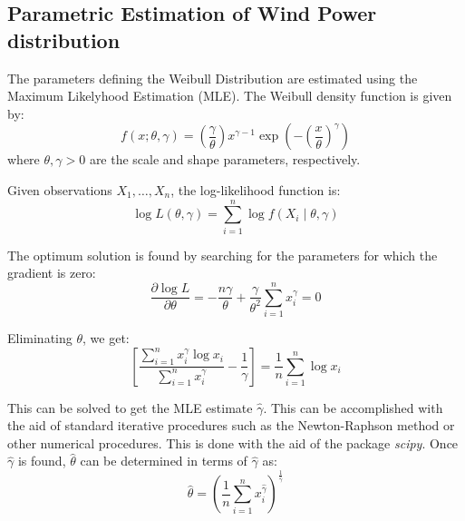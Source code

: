 {%

\subsection{Parametric Estimation of Wind Power distribution}\label{subsection: weib estim}

The parameters defining the Weibull Distribution are estimated using the Maximum Likelyhood Estimation (MLE). 
The Weibull density function is given by:
\begin{equation}
f(x; \theta, \gamma) = \left(\frac{\gamma}{\theta}\right)x^{\gamma-1}\exp\left(-\left(\frac{x}{\theta}\right)^\gamma\right)
\end{equation}
where \(\theta, \gamma > 0\) are the scale and shape parameters, respectively. 

Given observations \(X_1, \ldots, X_n\), the log-likelihood function is:
\begin{equation}
\log L(\theta, \gamma) = \sum_{i=1}^n \log f(X_i \mid \theta, \gamma)
\end{equation}

The optimum solution is found by searching for the parameters for which the gradient is zero:
\begin{equation}
\frac{\partial \log L}{\partial \theta} = -\frac{n \gamma}{\theta} + \frac{\gamma}{\theta^2} \sum_{i=1}^{n} x_i^\gamma = 0
\end{equation}

Eliminating $\theta$, we get:
\begin{equation}
\left[ \frac{\sum_{i=1}^{n} x_i^\gamma \log x_i}{\sum_{i=1}^{n} x_i^\gamma} - \frac{1}{\gamma} \right] = \frac{1}{n} \sum_{i=1}^{n} \log x_i
\end{equation}

This can be solved to get the MLE estimate $\hat{\gamma}$. 
This can be accomplished with the aid of standard iterative procedures such as the Newton-Raphson method or other numerical procedures. 
This is done with the aid of the package \emph{scipy}.
Once $\hat{\gamma}$ is found, $\hat{\theta}$ can be determined in terms of $\hat{\gamma}$ as:
\begin{equation}
\hat{\theta} = \left( \frac{1}{n} \sum_{i=1}^{n} x_i^{\hat{\gamma}} \right)^{\frac{1}{\hat{\gamma}}}
\end{equation}



}

